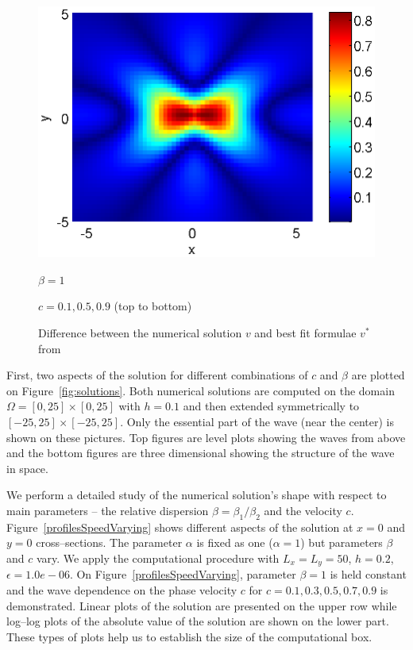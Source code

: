\documentclass[leqno,11pt]{book}
\begin{document}
\begin{figure}[htbp]
\begin{minipage}[b]{0.48\linewidth}
		 \includegraphics[width=\linewidth]{differences/difference_c=09_beta=1.eps}
		\centerline{$\beta = 1$}
		\centerline{$c = 0.1, 0.5, 0.9$ (top to bottom)}
	\end{minipage}
	\caption{Difference between the numerical solution $v$ and best fit formulae $v^*$ from \cite{Ch2011} }
	\label{fig:difference}
\end{figure}

First, two aspects of the solution for different combinations of  $c$ and $\beta$   are plotted  on Figure~\ref{fig:solutions}. Both numerical solutions are computed on the  domain $\Omega = [0, 25]\times [0, 25]$ with $h = 0.1$ and then extended symmetrically to $ [-25, 25]\times [-25, 25]$. 
Only the essential part of the wave (near the center) is shown on these pictures. Top figures are level plots showing the waves from above and the bottom figures are 
three dimensional showing the structure of the wave in space. 



We perform a detailed study   of the numerical solution's shape with respect to main parameters -- the relative dispersion $\beta=\beta_1 / \beta_2$ and the velocity $c$.
 Figure~\ref{profilesSpeedVarying} shows different aspects of the solution at $x=0$ and $y=0$ cross--sections. The parameter $\alpha$  is fixed as one ($\alpha = 1$) but  parameters $\beta $ and $c$ vary. We apply  the computational procedure with  $L_x = L_y = 50$, $h = 0.2$, $\epsilon = 1.0e-06$. 
On Figure~\ref{profilesSpeedVarying}, parameter $\beta=1$ is held constant and the wave dependence on the phase velocity  $c$ for $c=0.1, 0.3, 0.5, 0.7, 0.9$ is demonstrated.  Linear plots of the solution are presented on the upper row while  log--log plots of the absolute value of the solution are shown on the lower part.  These types of plots help us to establish the size of the computational box. 
\end{document}
